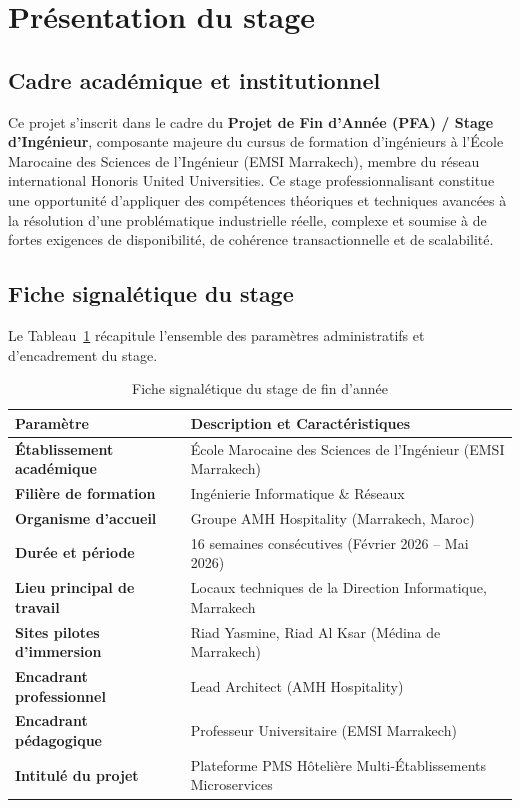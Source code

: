 \section{Présentation du stage}

\subsection{Cadre académique et institutionnel}

Ce projet s'inscrit dans le cadre du \textbf{Projet de Fin d'Année (PFA) / Stage d'Ingénieur}, composante majeure du cursus de formation d'ingénieurs à l'École Marocaine des Sciences de l'Ingénieur (EMSI Marrakech), membre du réseau international Honoris United Universities. Ce stage professionnalisant constitue une opportunité d'appliquer des compétences théoriques et techniques avancées à la résolution d'une problématique industrielle réelle, complexe et soumise à de fortes exigences de disponibilité, de cohérence transactionnelle et de scalabilité.

\subsection{Fiche signalétique du stage}

Le Tableau~\ref{tab:fiche_stage} récapitule l'ensemble des paramètres administratifs et d'encadrement du stage.

\begin{table}[H]
\centering
\small
\renewcommand{\arraystretch}{1.3}
\begin{tabularx}{\textwidth}{|p{4.5cm}|X|}
\hline
\textbf{Paramètre} & \textbf{Description et Caractéristiques} \\
\hline
\textbf{Établissement académique} & École Marocaine des Sciences de l'Ingénieur (EMSI Marrakech) \\
\hline
\textbf{Filière de formation} & Ingénierie Informatique \& Réseaux \\
\hline
\textbf{Organisme d'accueil} & Groupe AMH Hospitality (Marrakech, Maroc) \\
\hline
\textbf{Durée et période} & 16 semaines consécutives (Février 2026 -- Mai 2026) \\
\hline
\textbf{Lieu principal de travail} & Locaux techniques de la Direction Informatique, Marrakech \\
\hline
\textbf{Sites pilotes d'immersion} & Riad Yasmine, Riad Al Ksar (Médina de Marrakech) \\
\hline
\textbf{Encadrant professionnel} & Lead Architect (AMH Hospitality) \\
\hline
\textbf{Encadrant pédagogique} & Professeur Universitaire (EMSI Marrakech) \\
\hline
\textbf{Intitulé du projet} & Plateforme PMS Hôtelière Multi-Établissements Microservices \\
\hline
\end{tabularx}
\caption{Fiche signalétique du stage de fin d'année}
\label{tab:fiche_stage}
\end{table}

